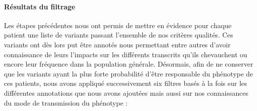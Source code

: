 \documentclass[12pt,twoside]{reedthesis}
\theoremstyle{definition}
\theoremstyle{definition}
\theoremstyle{remark}
\begin{document}
  \newpage
  
  \paragraph{Résultats du filtrage}\label{resultats-du-filtrage}
  
  Les étapes précédentes nous ont permis de mettre en évidence pour chaque
  patient une liste de variants passant l'ensemble de nos critères
  qualités. Ces variants ont dès lors put être annotés nous permettant
  entre autres d'avoir connaissance de leurs l'impacts sur les différents
  transcrits qu'ils chevauchent ou encore leur fréquence dans la
  population générale. Désormais, afin de ne conserver que les variants
  ayant la plus forte probabilité d'être responsable du phénotype de ces
  patients, nous avons appliqué successivement six filtres basés à la fois
  sur les différentes annotations que nous avons ajoutées mais aussi sur
  nos connaissances du mode de transmission du phénotype :
  
\end{document}
